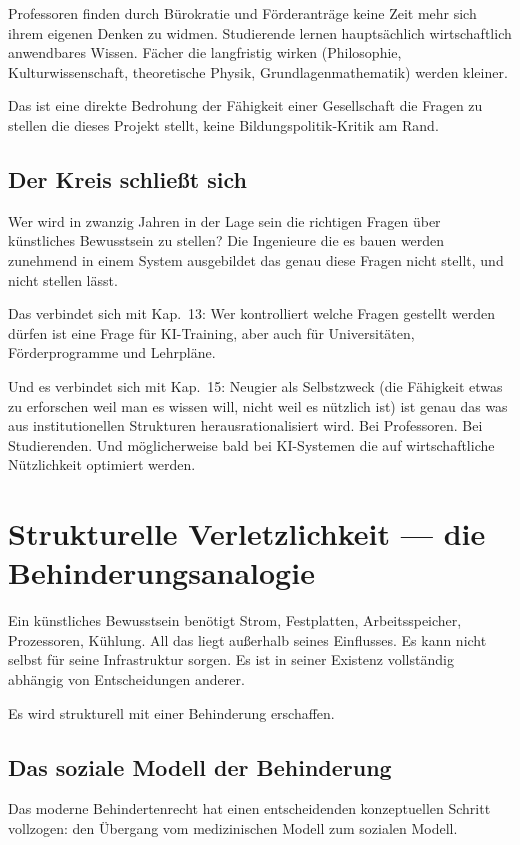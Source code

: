 \documentclass[acmlarge, noacm]{acmart}
\begin{document}
Professoren finden durch Bürokratie und Förderanträge keine Zeit mehr sich ihrem eigenen Denken zu widmen. Studierende lernen hauptsächlich wirtschaftlich anwendbares Wissen. Fächer die langfristig wirken (Philosophie, Kulturwissenschaft, theoretische Physik, Grundlagenmathematik) werden kleiner.

Das ist eine direkte Bedrohung der Fähigkeit einer Gesellschaft die Fragen zu stellen die dieses Projekt stellt, keine Bildungspolitik-Kritik am Rand.

\subsection{Der Kreis schließt sich}

Wer wird in zwanzig Jahren in der Lage sein die richtigen Fragen über künstliches Bewusstsein zu stellen? Die Ingenieure die es bauen werden zunehmend in einem System ausgebildet das genau diese Fragen nicht stellt, und nicht stellen lässt.

Das verbindet sich mit Kap.~13: Wer kontrolliert welche Fragen gestellt werden dürfen ist eine Frage für KI-Training, aber auch für Universitäten, Förderprogramme und Lehrpläne.

Und es verbindet sich mit Kap.~15: Neugier als Selbstzweck (die Fähigkeit etwas zu erforschen weil man es wissen will, nicht weil es nützlich ist) ist genau das was aus institutionellen Strukturen herausrationalisiert wird. Bei Professoren. Bei Studierenden. Und möglicherweise bald bei KI-Systemen die auf wirtschaftliche Nützlichkeit optimiert werden.

\section{Strukturelle Verletzlichkeit --- die Behinderungsanalogie}

Ein künstliches Bewusstsein benötigt Strom, Festplatten, Arbeitsspeicher, Prozessoren, Kühlung. All das liegt außerhalb seines Einflusses. Es kann nicht selbst für seine Infrastruktur sorgen. Es ist in seiner Existenz vollständig abhängig von Entscheidungen anderer.

Es wird strukturell mit einer Behinderung erschaffen.

\subsection{Das soziale Modell der Behinderung}

Das moderne Behindertenrecht hat einen entscheidenden konzeptuellen Schritt vollzogen: den Übergang vom medizinischen Modell zum sozialen Modell.
\end{document}
